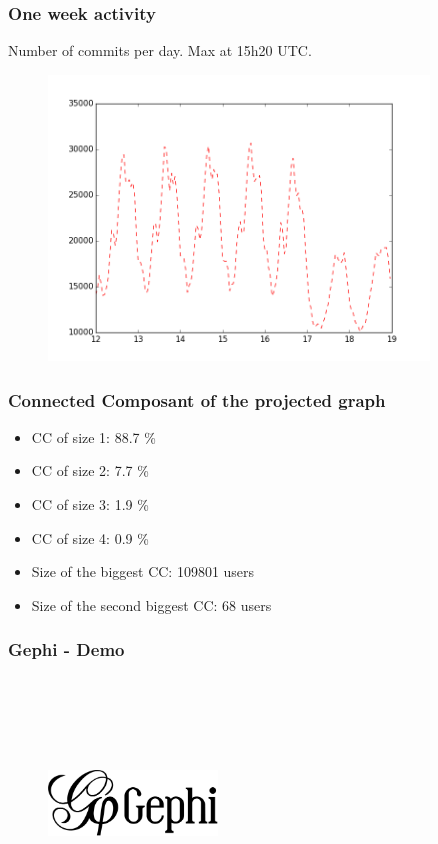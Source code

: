 \documentclass[12pt,t]{beamer}
\begin{document}
\begin{frame}
    \frametitle{One week activity}
        Number of commits per day.
        Max at 15h20 UTC.
        \begin{figure}
        \includegraphics[width=0.9\textwidth]{oneweekofactivity.png}
        \end{figure}
\end{frame}

\begin{frame}
	\frametitle{Connected Composant of the projected graph}
 \vspace{2cm}
   \begin{itemize}
\item CC of size 1:  88.7 \%
\item CC of size 2:  7.7 \%
\item CC of size 3: 1.9 \%
\item CC of size 4: 0.9 \%

\end{itemize}

   \begin{itemize}
\item Size of the biggest CC: 109801 users
\item Size of the second biggest CC: 68 users
\end{itemize}

\end{frame}

\begin{frame}
    \frametitle{Gephi - Demo}
       ~\\ ~\\ ~\\ ~\\
       \begin{figure}
        \includegraphics[width=0.4\textwidth]{Gephi-logo.png}
        \end{figure}
\end{frame}
\end{document}
